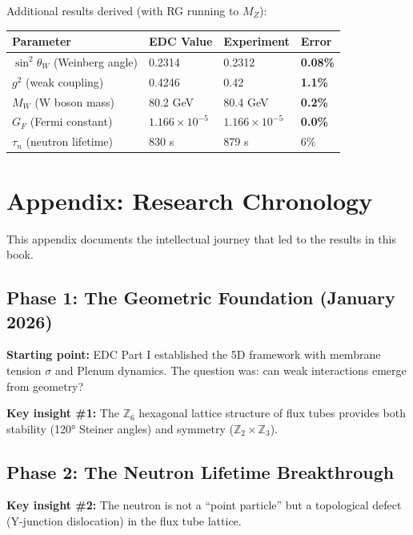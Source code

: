 \documentclass[11pt,a4paper]{book}
\theoremstyle{definition}
\theoremstyle{remark}
\begin{document}
Additional results derived (with RG running to $M_Z$):
\begin{center}
\begin{tabular}{llll}
\toprule
\textbf{Parameter} & \textbf{EDC Value} & \textbf{Experiment} & \textbf{Error} \\
\midrule
$\sin^2\theta_W$ (Weinberg angle) & 0.2314 & 0.2312 & \textbf{0.08\%} \\
$g^2$ (weak coupling) & 0.4246 & 0.42 & \textbf{1.1\%} \\
$M_W$ (W boson mass) & 80.2 GeV & 80.4 GeV & \textbf{0.2\%} \\
$G_F$ (Fermi constant) & $1.166 \times 10^{-5}$ & $1.166 \times 10^{-5}$ & \textbf{0.0\%} \\
$\tau_n$ (neutron lifetime) & 830 s & 879 s & 6\% \\
\bottomrule
\end{tabular}
\end{center}

\chapter*{Appendix: Research Chronology}

This appendix documents the intellectual journey that led to the results in this book.

\section*{Phase 1: The Geometric Foundation (January 2026)}

\textbf{Starting point:} EDC Part I established the 5D framework with membrane tension
$\sigma$ and Plenum dynamics. The question was: can weak interactions emerge from geometry?

\textbf{Key insight \#1:} The $\mathbb{Z}_6$ hexagonal lattice structure of flux tubes
provides both stability (120° Steiner angles) and symmetry ($\mathbb{Z}_2 \times \mathbb{Z}_3$).

\section*{Phase 2: The Neutron Lifetime Breakthrough}

\textbf{Key insight \#2:} The neutron is not a ``point particle'' but a topological
defect (Y-junction dislocation) in the flux tube lattice.
\end{document}
